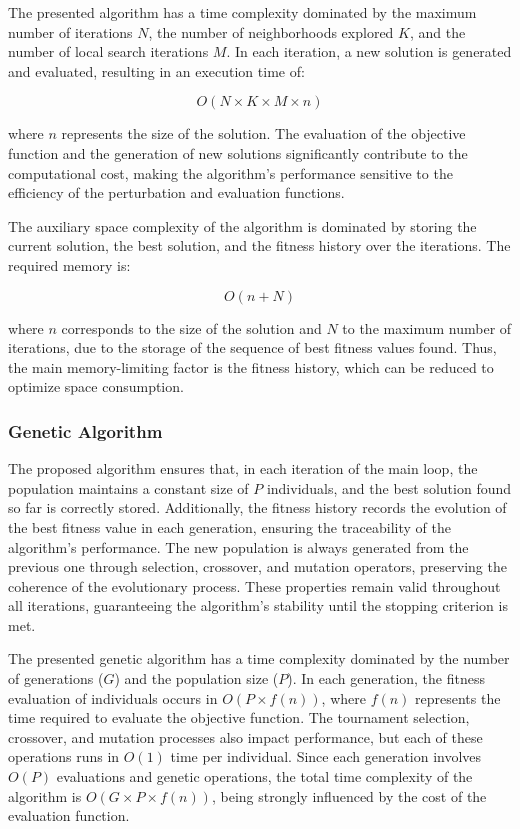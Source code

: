 \documentclass{article}
\begin{document}
	The presented algorithm has a time complexity dominated by the maximum number of iterations $N$, the number of neighborhoods explored $K$, and the number of local search iterations $M$. In each iteration, a new solution is generated and evaluated, resulting in an execution time of:
	
	\begin{equation}
		O(N \times K \times M \times n)
	\end{equation}
	
	
	where $n$ represents the size of the solution. The evaluation of the objective function and the generation of new solutions significantly contribute to the computational cost, making the algorithm's performance sensitive to the efficiency of the perturbation and evaluation functions.
	
	The auxiliary space complexity of the algorithm is dominated by storing the current solution, the best solution, and the fitness history over the iterations. The required memory is:
	
	\begin{equation}
		O(n + N)
	\end{equation}
	
	where \(n\) corresponds to the size of the solution and \(N\) to the maximum number of iterations, due to the storage of the sequence of best fitness values found. Thus, the main memory-limiting factor is the fitness history, which can be reduced to optimize space consumption.
	
	\subsubsection{Genetic Algorithm}
	
	The proposed algorithm ensures that, in each iteration of the main loop, the population maintains a constant size of $P$ individuals, and the best solution found so far is correctly stored. Additionally, the fitness history records the evolution of the best fitness value in each generation, ensuring the traceability of the algorithm’s performance. The new population is always generated from the previous one through selection, crossover, and mutation operators, preserving the coherence of the evolutionary process. These properties remain valid throughout all iterations, guaranteeing the algorithm’s stability until the stopping criterion is met.
	
	The presented genetic algorithm has a time complexity dominated by the number of generations ($G$) and the population size ($P$). In each generation, the fitness evaluation of individuals occurs in $O(P \times f(n))$, where $f(n)$ represents the time required to evaluate the objective function. The tournament selection, crossover, and mutation processes also impact performance, but each of these operations runs in $O(1)$ time per individual. Since each generation involves $ O(P)$ evaluations and genetic operations, the total time complexity of the algorithm is $O(G \times P \times f(n))$, being strongly influenced by the cost of the evaluation function.
	
\end{document}
